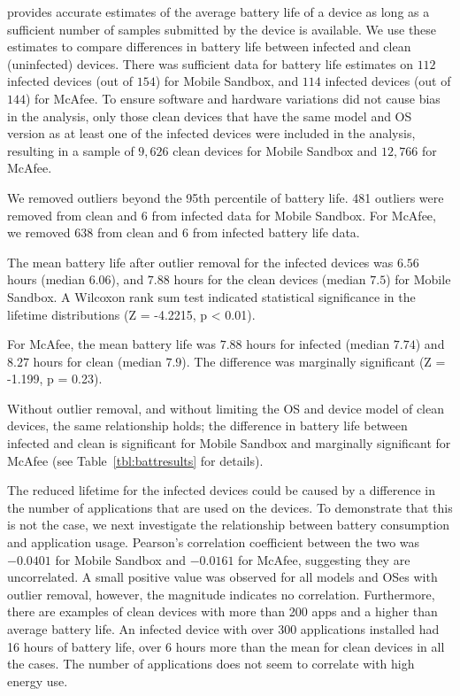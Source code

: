 \caratapp{} provides accurate estimates of the average battery life of
a device as long as a sufficient number of samples submitted
by the device is available. We use these estimates to compare
differences in battery life between infected and clean (uninfected)
devices. There was sufficient data for \caratapp{} battery life estimates on $112$ infected devices (out of $154$)
for Mobile Sandbox, and $114$ infected devices (out of $144$) for McAfee. To ensure
software and hardware variations did not cause bias in the analysis,
only those clean devices that have the same model and OS version as at
least one of the infected devices were included in the analysis,
resulting in a sample of $9,626$ clean devices for Mobile Sandbox and $12,766$
for McAfee.

We removed outliers beyond the 95th percentile of battery life.
481 outliers were removed from 
clean and 6 from infected data for Mobile Sandbox. For McAfee,
we removed 638 from clean and 6 from infected battery life data.


The mean battery life after outlier removal for the infected devices
was $6.56$ hours (median $6.06$), and $7.88$ hours for the clean devices
(median $7.5$) for Mobile Sandbox. A Wilcoxon rank sum test indicated
statistical significance in the lifetime distributions (Z = -4.2215, p
< 0.01).

For McAfee, the mean battery life was $7.88$ hours for infected (median
$7.74$) and $8.27$ hours for clean (median $7.9$). The difference was
marginally significant (Z = -1.199, p = 0.23).

Without outlier removal, and without limiting the OS and device model
of clean devices, the same relationship holds; the difference in battery
life between infected and clean is significant for Mobile Sandbox and
marginally significant for McAfee (see Table~\ref{tbl:battresults} for
details).









The reduced lifetime for the infected devices could be caused by a
difference in the number of applications that are used on the
devices. To demonstrate that this is not the case, we next investigate
the relationship between battery consumption and application
usage. Pearson's correlation coefficient between the two was $-0.0401$
for Mobile Sandbox and $-0.0161$ for McAfee, suggesting they are
uncorrelated. A small positive value was observed for all models and
OSes with outlier removal, however, the magnitude indicates no
correlation.  Furthermore, there are examples of clean devices with
more than 200 apps and a higher than average battery life.  An
infected device with over 300 applications installed had 16 hours of
battery life, over 6 hours more than the mean for clean devices 
in all the cases. The number of applications does not
seem to correlate with high energy use.


